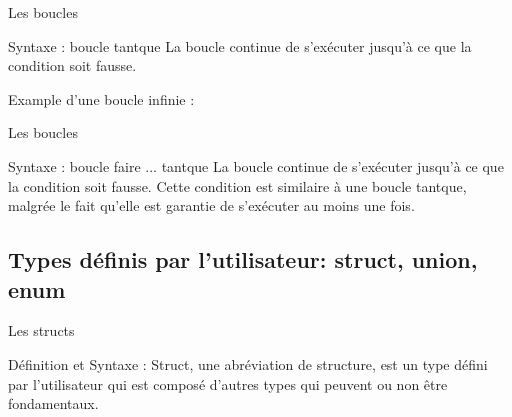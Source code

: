 

	\begin{frame}{Les boucles}
		\begin{block}{Syntaxe : boucle tantque}
			\WhileSyntax
			La boucle continue de s'exécuter jusqu'à ce que la condition soit \alert{fausse}.
		\end{block}
		\begin{exampleblock}{Example d'une boucle infinie :}
			\WhileInfinite
		\end{exampleblock}
	\end{frame}

	\begin{frame}{Les boucles}
		\begin{block}{Syntaxe : boucle faire ... tantque}
			\doWhileSyntax
			La boucle continue de s'exécuter jusqu'à ce que la condition soit \alert{fausse}. 
			Cette condition est similaire à une boucle tantque, malgrée le fait qu'elle est garantie de s'exécuter au moins une fois.
		\end{block}
	\end{frame}
	


  	\subsection{Types définis par l'utilisateur: struct, union, enum}
  	\begin{frame}{Les structs}
  		\begin{block}{Définition et Syntaxe :}
  			Struct, une abréviation de structure, est un type défini par l'utilisateur qui est composé d'autres types qui peuvent ou non être fondamentaux.
  			\structSyntax
  		\end{block}
  	\end{frame}
  
